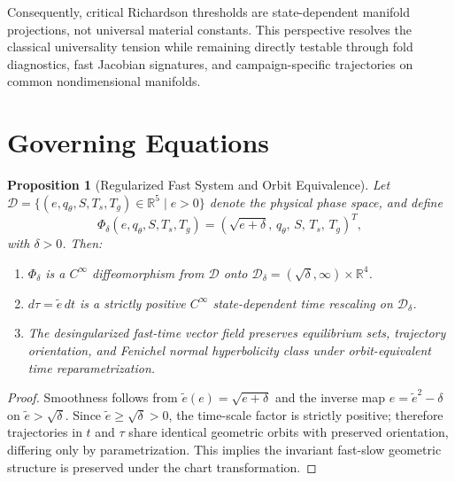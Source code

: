 \documentclass[11pt]{article}
\newtheorem{proposition}{Proposition}
\begin{document}
Consequently, critical Richardson thresholds are state-dependent manifold projections, not universal material constants. This perspective resolves the classical universality tension while remaining directly testable through fold diagnostics, fast Jacobian signatures, and campaign-specific trajectories on common nondimensional manifolds.

\section{Governing Equations}
\label{sec:governing_equations}

\begin{proposition}[Regularized Fast System and Orbit Equivalence]
\label{prop:regularized_fast_system}
Let $\mathcal{D} = \{ (e, q_\theta, S, T_s, T_g) \in \mathbb{R}^5 \mid e > 0 \}$ denote the physical phase space, and define
\begin{equation}
\Phi_\delta(e, q_\theta, S, T_s, T_g) = \left( \sqrt{e + \delta}, \, q_\theta, \, S, \, T_s, \, T_g \right)^T,
\end{equation}
with $\delta > 0$. Then:
\begin{enumerate}
\item $\Phi_\delta$ is a $C^\infty$ diffeomorphism from $\mathcal{D}$ onto $\mathcal{D}_\delta = (\sqrt{\delta}, \infty) \times \mathbb{R}^4$.
\item $d\tau = \tilde{e} \, dt$ is a strictly positive $C^\infty$ state-dependent time rescaling on $\mathcal{D}_\delta$.
\item The desingularized fast-time vector field preserves equilibrium sets, trajectory orientation, and Fenichel normal hyperbolicity class under orbit-equivalent time reparametrization.
\end{enumerate}
\end{proposition}

\begin{proof}
Smoothness follows from $\tilde{e}(e)=\sqrt{e+\delta}$ and the inverse map $e=\tilde{e}^2-\delta$ on $\tilde{e}>\sqrt{\delta}$.
Since $\tilde{e}\ge\sqrt{\delta}>0$, the time-scale factor is strictly positive; therefore trajectories in $t$ and $\tau$ share identical geometric orbits with preserved orientation, differing only by parametrization.
This implies the invariant fast-slow geometric structure is preserved under the chart transformation.
\end{proof}
\end{document}
